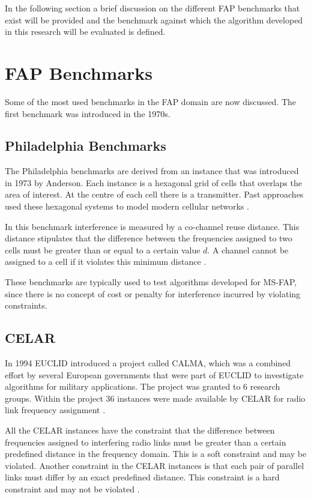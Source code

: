 In the following section a brief discussion on the different FAP benchmarks that exist will be provided and the benchmark against which the algorithm developed in this research will be evaluated is defined.
\section{FAP Benchmarks}
\label{sec:FAPBenchmarks}
Some of the most used benchmarks in the FAP domain are now discussed. The first benchmark was introduced in the 1970s.
\subsection{Philadelphia Benchmarks}
The Philadelphia benchmarks are derived from an instance that was introduced in 1973 by Anderson. Each instance is a hexagonal grid of cells that overlaps the area of interest. At the centre of each cell there is a transmitter. Past approaches used these hexagonal systems to model modern cellular networks \cite{Karen2004,ExactMIFAP}.

In this benchmark interference is measured by a co-channel reuse distance. This distance stipulates that the difference between the frequencies  assigned to two cells must be greater than or equal to a certain value $d$. A channel cannot be assigned to a cell if it violates this minimum distance \cite{Karen2004,ExactMIFAP}.

These benchmarks are typically used to test algorithms developed for MS-FAP, since there is no concept of cost or penalty for interference incurred by violating constraints.
\subsection{CELAR}
In 1994 EUCLID introduced a project called CALMA, which was a combined effort by several European governments that were part of EUCLID to investigate algorithms for military applications. The project was granted to 6 research groups. Within the project 36 instances were made available by CELAR for radio link frequency assignment \cite{Karen2004,DynamicFAP}.

All the CELAR instances have the constraint that the difference between frequencies assigned to interfering radio links must be greater than a certain predefined distance in the frequency domain. This is a soft constraint and may be violated. Another constraint in the CELAR instances is that each pair of parallel links must differ by an exact predefined distance. This constraint is a hard constraint and may not be violated \cite{DynamicFAP}.

